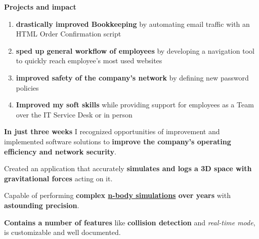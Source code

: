 \documentclass[]{jonas-cv}
\begin{document}
\begin{minipage}[t]{0.63\textwidth} 


\tinysectionsep
{}
\sectionsep

\begin{tightemize}
    \item \textbf{Projects and impact}
    \begin{enumerate}
        \item \textbf{drastically improved Bookkeeping} by automating email traffic with an HTML Order Confirmation script
        \item \textbf{sped up general workflow of employees} by developing a navigation tool to quickly reach employee's most used websites
        \item \textbf{improved safety of the company's network} by defining new password policies
        \item \textbf{Improved my soft skills} while providing support for employees as a Team over the IT Service Desk or in person
    \end{enumerate}
    \vspace{1mm}

    \item [\faicon{angle-double-right}] \textbf{In just three weeks} I recognized opportunities of improvement and implemented software solutions
    to \textbf{improve the company's operating efficiency and network security}.
\end{tightemize}
\largesectionsep



\tinysectionsep
{}
\begin{tightemize}
    \item Created an application that accurately \textbf{simulates and logs a 3D space with gravitational forces} acting on it.
    \item Capable of performing \textbf{complex \href{https://en.wikipedia.org/wiki/N-body_problem}{n-body simulations} over years} with \textbf{astounding precision}.
    \item \textbf{Contains a number of features} like \textbf{collision detection} and \emph{real-time mode}, is customizable and well documented.


\end{tightemize}
\end{minipage}
\end{document}
